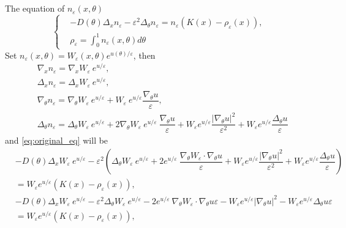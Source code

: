 \documentclass[preprint]{article}
\numberwithin{equation}{section}
\begin{document}
\section{}
The equation of $n_\varepsilon (x,\theta)$
\begin{equation}\label{eq:original_eq}
\left\{
\begin{aligned}
&-D(\theta)\Delta_x n_\varepsilon -\varepsilon^2\Delta_\theta n_\varepsilon = n_\varepsilon(K(x)-\rho_\varepsilon(x)),\\
&\rho_\varepsilon = \int_0^1n_\varepsilon(x,\theta) d\theta
\end{aligned}
\right.
\end{equation}
Set $n_\varepsilon(x,\theta) = W_\varepsilon(x,\theta) e^{u(\theta)/\varepsilon}$, then
\begin{equation}
\begin{aligned}
&\nabla_x n_\varepsilon = \nabla_x W_\varepsilon ~e^{u/\varepsilon},\\
&\Delta_x n_\varepsilon = \Delta_x W_\varepsilon ~e^{u/\varepsilon},\\
&\nabla_\theta n_\varepsilon = \nabla_\theta W_\varepsilon ~e^{u/\varepsilon} + W_\varepsilon ~e^{u/\varepsilon} \dfrac{\nabla_\theta u}{\varepsilon},\\
&\Delta_\theta n_\varepsilon = \Delta_\theta W_\varepsilon ~e^{u/\varepsilon} + 2\nabla_\theta W_\varepsilon~e^{u/\varepsilon}~\dfrac{\nabla_\theta u}{\varepsilon} + W_\varepsilon e^{u/\varepsilon}\dfrac{|\nabla_\theta u|^2}{\varepsilon^2} + W_\varepsilon e^{u/\varepsilon}\dfrac{\Delta_\theta u}{\varepsilon}
\end{aligned}
\end{equation}
and \eqref{eq:original_eq} will be
\begin{equation}
\begin{aligned}
&-D(\theta)\Delta_x W_\varepsilon ~e^{u/\varepsilon} -\varepsilon^2\left(\Delta_\theta W_\varepsilon ~e^{u/\varepsilon} + 2e^{u/\varepsilon}~\dfrac{\nabla_\theta W_\varepsilon\cdot \nabla_\theta u}{\varepsilon} + W_\varepsilon e^{u/\varepsilon}\dfrac{|\nabla_\theta u|^2}{\varepsilon^2} + W_\varepsilon e^{u/\varepsilon}\dfrac{\Delta_\theta u}{\varepsilon}\right)\\
&= W_\varepsilon e^{u/\varepsilon}(K(x)-\rho_\varepsilon(x)),\\
&-D(\theta)\Delta_x W_\varepsilon ~e^{u/\varepsilon} -\varepsilon^2\Delta_\theta W_\varepsilon ~e^{u/\varepsilon} - 2e^{u/\varepsilon}~\nabla_\theta W_\varepsilon\cdot \nabla_\theta u\varepsilon - W_\varepsilon e^{u/\varepsilon}|\nabla_\theta u|^2 - W_\varepsilon e^{u/\varepsilon}\Delta_\theta u\varepsilon\\
&= W_\varepsilon e^{u/\varepsilon}(K(x)-\rho_\varepsilon(x)),\\
\end{aligned}
\end{equation}
\end{document}

